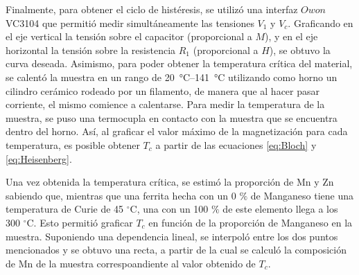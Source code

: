     Finalmente, para obtener el ciclo de histéresis, se utilizó una interfaz $Owon$ VC3104 \cite{owon} que permitió medir simultáneamente las tensiones \(V_1\) y \(V_c\). Graficando en el eje vertical la tensión sobre el capacitor (proporcional a \(M\)), y en el eje horizontal la tensión sobre la resistencia \(R_1\) (proporcional a \(H\)), se obtuvo la curva deseada. Asimismo, para poder obtener la temperatura crítica del material, se calentó la muestra en un rango de \SIrange{20}{141}{\celsius} utilizando como horno un cilindro cerámico rodeado por un filamento, de manera que al hacer pasar corriente, el mismo comience a calentarse. Para medir la temperatura de la muestra, se puso una termocupla en contacto con la muestra que se encuentra dentro del horno. Así, al graficar el valor máximo de la magnetización para cada temperatura, es posible obtener \(T_c\) a partir de las ecuaciones \eqref{eq:Bloch} y \eqref{eq:Heisenberg}.


    Una vez obtenida la temperatura crítica, se estimó la proporción de Mn y Zn sabiendo que, mientras que una ferrita hecha con un 0 \(\%\) de Manganeso tiene una temperatura de Curie de 45 $^\circ$C, una con un 100 \(\%\) de este elemento llega a los 300 $^\circ$C. Esto permitió graficar \(T_c\) en función de la proporción de Manganeso en la muestra. Suponiendo una dependencia lineal, se interpoló entre los dos puntos mencionados y se obtuvo una recta, a partir de la cual se calculó la composición de Mn de la muestra correspoandiente al valor obtenido de \(T_c\).
